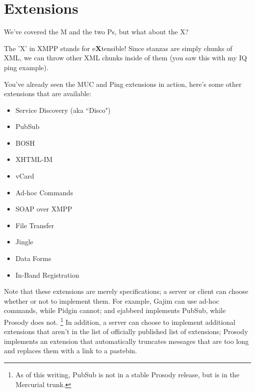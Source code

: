 \section{Extensions}

\pause

We've covered the M and the two Ps, but what about the X?

\pause

The 'X' in XMPP stands for e\textbf{X}tensible!  Since stanzas are simply chunks of XML,
we can throw other XML chunks inside of them (you saw this with my IQ ping example).

\pause
You've already seen the MUC and Ping extensions in action, here's some other extensions that
are available:

\pause
\begin{itemize}
\setlength{\itemsep}{1pt}

\item Service Discovery (aka ``Disco")
\pause
\item PubSub
\pause
\item BOSH
\pause
\item XHTML-IM
\pause
\item vCard
\pause
\item Ad-hoc Commands
\pause
\item SOAP over XMPP
\pause
\item File Transfer
\pause
\item Jingle
\pause
\item Data Forms
\pause
\item In-Band Registration
\end{itemize}

\pause

Note that these extensions are merely specifications; a server or client can choose whether or not to implement
them.  For example, Gajim can use ad-hoc commands, while Pidgin cannot; and ejabberd implements PubSub, while
Prosody does not. \footnote{As of this writing, PubSub is not in a stable Prosody release, but is in the Mercurial trunk.}
In addition, a server can choose to implement additional extensions that aren't in the list
of officially published list of extensions; Prosody implements an extension that automatically truncates messages
that are too long and replaces them with a link to a pastebin.
